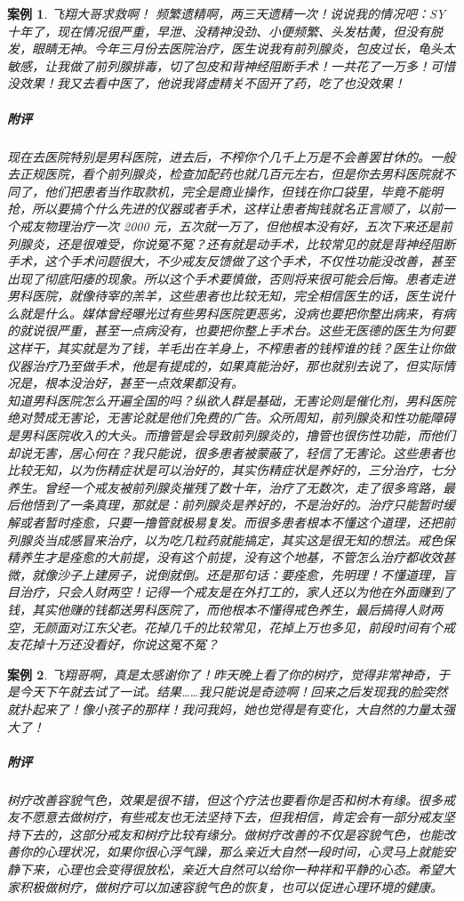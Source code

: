 \documentclass{ctexart}
\newtheorem{case}{案例}
\begin{document}
\begin{case}
    飞翔大哥求救啊！ 频繁遗精啊，两三天遗精一次！说说我的情况吧：SY 十年了，现在情况很严重，早泄、没精神没劲、小便频繁、头发枯黄，但没有脱发，眼睛无神。今年三月份去医院治疗，医生说我有前列腺炎，包皮过长，龟头太敏感，让我做了前列腺排毒，切了包皮和背神经阻断手术！一共花了一万多！可惜没效果！我又去看中医了，他说我肾虚精关不固开了药，吃了也没效果！
    \subparagraph{附评} 现在去医院特别是男科医院，进去后，不榨你个几千上万是不会善罢甘休的。一般去正规医院，看个前列腺炎，检查加配药也就几百元左右，但是你去男科医院就不同了，他们把患者当作取款机，完全是商业操作，但钱在你口袋里，毕竟不能明抢，所以要搞个什么先进的仪器或者手术，这样让患者掏钱就名正言顺了，以前一个戒友物理治疗一次 2000 元，五次就一万了，但他根本没有好，五次下来还是前列腺炎，还是很难受，你说冤不冤？还有就是动手术，比较常见的就是背神经阻断手术，这个手术问题很大，不少戒友反馈做了这个手术，不仅性功能没改善，甚至出现了彻底阳痿的现象。所以这个手术要慎做，否则将来很可能会后悔。患者走进男科医院，就像待宰的羔羊，这些患者也比较无知，完全相信医生的话，医生说什么就是什么。媒体曾经曝光过有些男科医院更恶劣，没病也要把你整出病来，有病的就说很严重，甚至一点病没有，也要把你整上手术台。这些无医德的医生为何要这样干，其实就是为了钱，羊毛出在羊身上，不榨患者的钱榨谁的钱？医生让你做仪器治疗乃至做手术，他是有提成的，如果真能治好，那也就别去说了，但实际情况是，根本没治好，甚至一点效果都没有。\\
    知道男科医院怎么开遍全国的吗？纵欲人群是基础，无害论则是催化剂，男科医院绝对赞成无害论，无害论就是他们免费的广告。众所周知，前列腺炎和性功能障碍是男科医院收入的大头。而撸管是会导致前列腺炎的，撸管也很伤性功能，而他们却说无害，居心何在？我只能说，很多患者被蒙蔽了，轻信了无害论。这些患者也比较无知，以为伤精症状是可以治好的，其实伤精症状是养好的，三分治疗，七分养生。曾经一个戒友被前列腺炎摧残了数十年，治疗了无数次，走了很多弯路，最后他悟到了一条真理，那就是：前列腺炎是养好的，不是治好的。治疗只能暂时缓解或者暂时痊愈，只要一撸管就极易复发。而很多患者根本不懂这个道理，还把前列腺炎当成感冒来治疗，以为吃几粒药就能搞定，其实这是很无知的想法。戒色保精养生才是痊愈的大前提，没有这个前提，没有这个地基，不管怎么治疗都收效甚微，就像沙子上建房子，说倒就倒。还是那句话：要痊愈，先明理！不懂道理，盲目治疗，只会人财两空！记得一个戒友是在外打工的，家人还以为他在外面赚到了钱，其实他赚的钱都送男科医院了，而他根本不懂得戒色养生，最后搞得人财两空，无颜面对江东父老。花掉几千的比较常见，花掉上万也多见，前段时间有个戒友花掉十万还没看好，你说这冤不冤？
\end{case}

\begin{case}
    飞翔哥啊，真是太感谢你了！昨天晚上看了你的树疗，觉得非常神奇，于是今天下午就去试了一试。结果……我只能说是奇迹啊！回来之后发现我的脸突然就扑起来了！像小孩子的那样！我问我妈，她也觉得是有变化，大自然的力量太强大了！
    \subparagraph{附评} 树疗改善容貌气色，效果是很不错，但这个疗法也要看你是否和树木有缘。很多戒友不愿意去做树疗，有些戒友也无法坚持下去，但我相信，肯定会有一部分戒友坚持下去的，这部分戒友和树疗比较有缘分。做树疗改善的不仅是容貌气色，也能改善你的心理状况，如果你很心浮气躁，那么亲近大自然一段时间，心灵马上就能安静下来，心理也会变得很放松，亲近大自然可以给你一种祥和平静的心态。希望大家积极做树疗，做树疗可以加速容貌气色的恢复，也可以促进心理环境的健康。
\end{case}
\end{document}
